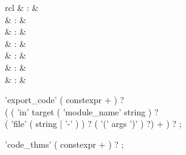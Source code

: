 \begin{isabellebody}
\begin{isamarkuptext}
\begin{matharray}{rcl}
    \hypertarget{command.HOL.code-monad}{\hyperlink{command.HOL.code-monad}{\mbox{}}} & : &  \\
    \hypertarget{command.HOL.code-reserved}{\hyperlink{command.HOL.code-reserved}{\mbox{}}} & : &  \\
    \hypertarget{command.HOL.code-include}{\hyperlink{command.HOL.code-include}{\mbox{}}} & : &  \\
    \hypertarget{command.HOL.code-modulename}{\hyperlink{command.HOL.code-modulename}{\mbox{}}} & : &  \\
    \hypertarget{command.HOL.code-abort}{\hyperlink{command.HOL.code-abort}{\mbox{}}} & : &  \\
    \hypertarget{command.HOL.print-codesetup}{\hyperlink{command.HOL.print-codesetup}{\mbox{}}}\isa{{\isachardoublequote}\isactrlsup {\isacharasterisk}{\isachardoublequote}} & : &  \\
    \hypertarget{attribute.HOL.code}{\hyperlink{attribute.HOL.code}{\mbox{}}} & : &  \\
  \end{matharray}

  \begin{rail}
    'export\_code' ( constexpr + ) ? \\
      ( ( 'in' target ( 'module\_name' string ) ? \\
        ( 'file' ( string | '-' ) ) ? ( '(' args ')' ) ?) + ) ?
    ;

    'code\_thms' ( constexpr + ) ?
    ;


\end{rail}
\end{isamarkuptext}
\end{isabellebody}
